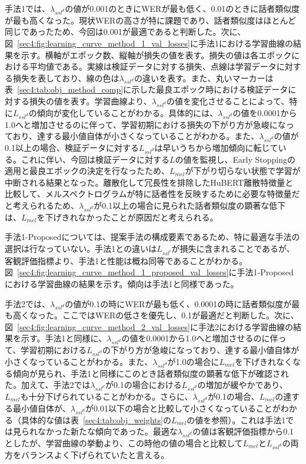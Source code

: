 \documentclass[12pt]{jarticle}
\numberwithin{equation}{section}    %
\numberwithin{figure}{section}      %
\numberwithin{table}{section}      %
\begin{document}
手法1では、$\lambda_{ssl^{d}}$の値が0.001のときにWERが最も低く、0.01のときに話者類似度が最も高くなった。現状WERの高さが特に課題であり、話者類似度はほとんど同じであったため、今回は0.001が最適であると判断した。次に、図~\ref{sec4:fig:learning_curve_method_1_val_losses}に手法1における学習曲線の結果を示す。横軸がエポック数、縦軸が損失の値を表す。損失の値は各エポックにおける平均値である。実線は検証データに対する損失、点線は学習データに対する損失を表しており、線の色は$\lambda_{ssl^{d}}$の違いを表す。また、丸いマーカーは表~\ref{sec4:tab:obj_method_comp}に示した最良エポック時における検証データに対する損失の値を表す。学習曲線より、$\lambda_{ssl^{d}}$の値を変化させることによって、特に$L_{ssl^{d}}$の傾向が変化していることがわかる。具体的には、$\lambda_{ssl^{d}}$の値を0.0001から1.0へと増加させるのに伴って、学習初期における損失の下がり方が急峻になっており、達する最小値自体が小さくなっていることがわかる。また、$\lambda_{ssl^{d}}$の値が0.1以上の場合、検証データに対する$L_{ssl^{d}}$は早いうちから増加傾向に転じている。これに伴い、今回は検証データに対する$L$の値を監視し、Early Stoppingの適用と最良エポックの決定を行なったため、$L_{mel}$が下がり切らない状態で学習が中断される結果となった。離散化して冗長性を排除したHuBERT離散特徴量と比較して、メルスペクトログラムが特に話者性を反映するために必要な特徴量だと考えられるため、$\lambda_{ssl^{d}}$が0.1以上の場合に見られた話者類似度の顕著な低下は、$L_{mel}$を下げきれなかったことが原因だと考えられる。

手法1-Proposedについては、提案手法の構成要素であるため、特に最適な手法の選択は行なっていない。手法1との違いは$L_{ssl^{i}}$が損失に含まれることであるが、客観評価指標より、手法1と性能は概ね同等であることがわかる。図~\ref{sec4:fig:learning_curve_method_1_proposed_val_losses}に手法1-Proposedにおける学習曲線の結果を示す。傾向は手法1と同様であった。

手法2では、$\lambda_{ssl^{d}}$の値が0.1の時にWERが最も低く、0.0001の時に話者類似度が最も高くなった。ここではWERの低さを優先し、0.1が最適だと判断した。次に、図~\ref{sec4:fig:learning_curve_method_2_val_losses}に手法2における学習曲線の結果を示す。手法1と同様に、$\lambda_{ssl^{d}}$の値を0.0001から1.0へと増加させるのに伴って、学習初期における$L_{ssl^{d}}$の下がり方が急峻になっており、達する最小値自体が小さくなっていることがわかる。また、$\lambda_{ssl^{d}}$が1.0の場合に$L_{mel}$を下げきれなくなる傾向が見られ、手法1と同様にこのとき話者類似度の顕著な低下が確認された。加えて、手法2では$\lambda_{ssl^{d}}$が0.1の場合における$L_{ssl^{d}}$の増加が緩やかであり、$L_{mel}$も十分下げられていることがわかる。さらに、$\lambda_{ssl^{d}}$が0.1の場合、$L_{mel}$の達する最小値自体が、$\lambda_{ssl^{d}}$が0.01以下の場合と比較して小さくなっていることがわかる（具体的な値は表~\ref{sec4:tab:obj_weights}の$L_{mel}$の値を参照）。これは手法1では見られなかった新たな傾向であった。最適な$\lambda_{ssl^{d}}$の値は客観評価指標から0.1としたが、学習曲線の挙動より、この時他の値の場合と比較して$L_{mel}$と$L_{ssl^{d}}$の両方をバランスよく下げられていたと言える。
\end{document}
